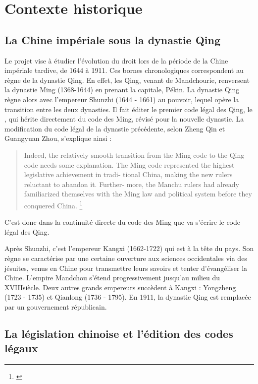 \section{Contexte historique}
    \subsection{La Chine impériale sous la dynastie Qing}

Le projet \COREL vise à étudier l'évolution du droit lors de la période de la Chine impériale tardive, de 1644 à 1911. Ces bornes chronologiques correspondent au règne de la dynastie Qing. En effet, les Qing, venant de Mandchourie, renversent la dynastie Ming (1368-1644) en prenant la capitale, Pékin. La dynastie Qing règne alors avec l'empereur Shunzhi (1644 - 1661) au pouvoir, lequel opère la transition entre les deux dynasties. Il fait éditer le premier code légal des Qing, le \dqlj, qui hérite directement du code des Ming, révisé pour la nouvelle dynastie. La modification du code légal de la dynastie précédente, selon Zheng Qin et Guangyuan Zhou, s'explique ainsi : 

\begin{quote}
    Indeed, the relatively smooth transition
 from the Ming code to the Qing code needs some explanation. The
 Ming code represented the highest legislative achievement in tradi-
 tional China, making the new rulers reluctant to abandon it. Further-
 more, the Manchu rulers had already familiarized themselves with the
 Ming law and political system before they conquered China. \footnote{\cite{qin_pursuing_1995}}
\end{quote}
C'est donc dans la continuité directe du code des Ming que va s'écrire le code légal des Qing.

Après Shunzhi, c'est l'empereur Kangxi (1662-1722) qui est à la tête du pays. Son règne se caractérise par une certaine ouverture aux sciences occidentales via des jésuites, venus en Chine pour transmettre leurs savoirs et tenter d'évangéliser la Chine. L'empire Mandchou s'étend progressivement jusqu'au milieu du XVIII\ieme siècle. Deux autres grands empereurs succèdent à Kangxi : Yongzheng (1723 - 1735) et Qianlong (1736 - 1795). En 1911, la dynastie Qing est remplacée par un gouvernement républicain.

\subsection{La législation chinoise et l’édition des codes légaux}

